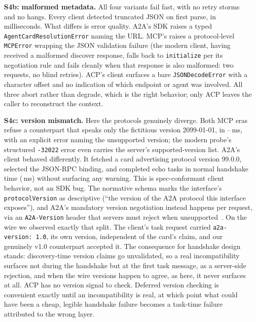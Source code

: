 \documentclass[10pt]{article}
\newcommand{\code}[1]{\mbox{\texttt{#1}}}
\begin{document}
\textbf{S4b: malformed metadata.} All four variants fail fast, with no
retry storms and no hangs. Every client detected truncated JSON on first
parse, in milliseconds. What differs is error quality. A2A's SDK raises a
typed \code{AgentCardResolutionError} naming the URL. MCP's raises a
protocol-level \code{MCPError} wrapping the JSON validation failure
(the modern client, having received a malformed discover response, falls
back to \code{initialize} per its negotiation rule and fails cleanly
when that response is also malformed: two requests, no blind retries).
ACP's client surfaces a bare \code{JSONDecodeError} with a character
offset and no indication of which endpoint or agent was involved. All
three abort rather than degrade, which is the right behavior; only ACP
leaves the caller to reconstruct the context.


\textbf{S4c: version mismatch.} Here the protocols genuinely diverge.
Both MCP eras refuse a counterpart that speaks only the fictitious
version 2099-01-01, in
\SFourCMcpLegacyLocalTtfMed{}--\SFourCMcpModernLocalTtfMed{}\,ms, with an
explicit error naming the unsupported version; the modern probe's
structured \texttt{-32022} error even carries the server's
supported-version list. A2A's client behaved differently. It fetched a
card advertising protocol version 99.0.0, selected the JSON-RPC binding,
and completed echo tasks in normal handshake time
(\SFourCAtoaLocalMed{}\,ms) without surfacing any warning. This is
spec-conformant client behavior, not an SDK bug. The normative schema
marks the interface's \code{protocolVersion} as descriptive (``the
version of the A2A protocol this interface exposes''), and A2A's
mandatory version negotiation instead happens per request, via an
\code{A2A-Version} header that servers must reject when
unsupported~\citep{a2aspec2026}. On the wire we observed exactly that
split. The client's task request carried \texttt{a2a-version: 1.0}, its
own version, independent of the card's claim, and our genuinely v1.0
counterpart accepted it. The consequence for handshake design stands:
discovery-time version claims go unvalidated, so a real incompatibility
surfaces not during the handshake but at the first task message, as a
server-side rejection, and when the wire versions happen to agree, as
here, it never surfaces at all. ACP has no version signal to check.
Deferred version checking is convenient exactly until an incompatibility
is real, at which point what could have been a cheap, legible handshake
failure becomes a task-time failure attributed to the wrong layer.
\end{document}

